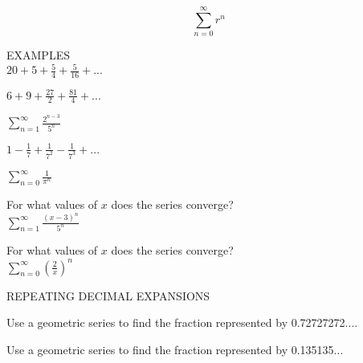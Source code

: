 \documentclass[11pt]{article}
\begin{document}
\begin{displaymath}
\sum_{n=0}^{\infty} r^n 
  \end{displaymath}

\pagebreak

EXAMPLES\\

$20 + 5 + \frac54 + \frac{5}{16}+ ...$

\vspace{2in}


$6 + 9 + \frac{27}{2} + \frac{81}{4}+ ...$


\vspace{2in}


$\sum_{n=1}^{\infty}\frac{2^{n-3}}{5^n}$
	
	\vspace{2in}

$1 - \frac17 + \frac{1}{7^2} - \frac{1}{7^3}+ ...$


\vspace{2in}

$\sum_{n=0}^{\infty}\frac{1}{\pi^n}$

\vspace{1.5in}

For what values of $x$ does the series converge?\\

$\sum_{n=1}^{\infty}\frac{(x-3)^n}{5^n}$



\vspace{2in}

For what values of $x$ does the series converge?\\

$\sum_{n=0}^{\infty}\left(\frac{2}{x}\right)^n$

\vspace{2in}

\pagebreak

REPEATING DECIMAL EXPANSIONS \\

\vspace{0.15in}


Use a geometric series to find the fraction represented by 0.72727272....\\

\vspace{2.5in}

Use a geometric series to find the fraction represented by 0.135135...\\

\vspace{3in}
\end{document}
